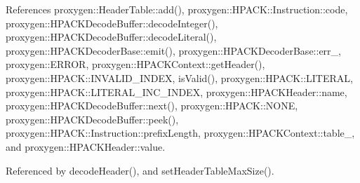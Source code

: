 References proxygen\+::\+Header\+Table\+::add(), proxygen\+::\+H\+P\+A\+C\+K\+::\+Instruction\+::code, proxygen\+::\+H\+P\+A\+C\+K\+Decode\+Buffer\+::decode\+Integer(), proxygen\+::\+H\+P\+A\+C\+K\+Decode\+Buffer\+::decode\+Literal(), proxygen\+::\+H\+P\+A\+C\+K\+Decoder\+Base\+::emit(), proxygen\+::\+H\+P\+A\+C\+K\+Decoder\+Base\+::err\+\_\+, proxygen\+::\+E\+R\+R\+OR, proxygen\+::\+H\+P\+A\+C\+K\+Context\+::get\+Header(), proxygen\+::\+H\+P\+A\+C\+K\+::\+I\+N\+V\+A\+L\+I\+D\+\_\+\+I\+N\+D\+EX, is\+Valid(), proxygen\+::\+H\+P\+A\+C\+K\+::\+L\+I\+T\+E\+R\+AL, proxygen\+::\+H\+P\+A\+C\+K\+::\+L\+I\+T\+E\+R\+A\+L\+\_\+\+I\+N\+C\+\_\+\+I\+N\+D\+EX, proxygen\+::\+H\+P\+A\+C\+K\+Header\+::name, proxygen\+::\+H\+P\+A\+C\+K\+Decode\+Buffer\+::next(), proxygen\+::\+H\+P\+A\+C\+K\+::\+N\+O\+NE, proxygen\+::\+H\+P\+A\+C\+K\+Decode\+Buffer\+::peek(), proxygen\+::\+H\+P\+A\+C\+K\+::\+Instruction\+::prefix\+Length, proxygen\+::\+H\+P\+A\+C\+K\+Context\+::table\+\_\+, and proxygen\+::\+H\+P\+A\+C\+K\+Header\+::value.



Referenced by decode\+Header(), and set\+Header\+Table\+Max\+Size().



